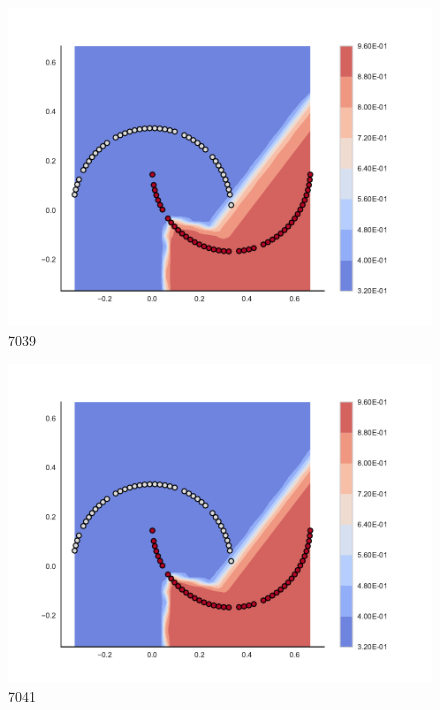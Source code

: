 \begin{subfigure}[b]{0.09\textwidth}
    \includegraphics[clip, trim=2.35cm 1.75cm 4.5cm 0cm,width=\textwidth]{img/convergence/7039.pdf}
    \caption{7039}
    \label{fig:convergence_7039}
\end{subfigure}
%
\begin{subfigure}[b]{0.09\textwidth}
    \includegraphics[clip, trim=2.35cm 1.75cm 4.5cm 0cm,width=\textwidth]{img/convergence/7041.pdf}
    \caption{7041}
    \label{fig:convergence_7041}
\end{subfigure}
%
